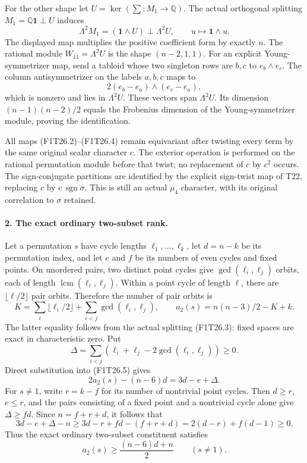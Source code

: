 For the other shape let $U=\ker(\sum:M_1\to\mathbb Q)$.
The actual orthogonal splitting
$M_1=\mathbb Q\boldsymbol1\perp U$ induces
\[
 \Lambda^2M_1=(\boldsymbol1\wedge U)
                  \mathbin{\perp}\Lambda^2U,
 \qquad u\longmapsto\boldsymbol1\wedge u.
 \tag{F1T26.4}
\]
The displayed map multiplies the positive coefficient
form by exactly $n$. The rational module
$W_{11}=\Lambda^2U$ is the shape $(n-2,1,1)$.
For an explicit Young-symmetrizer map, send a tabloid
whose two singleton rows are $b,c$ to $e_b\wedge e_c$.
The column antisymmetrizer on the labels $a,b,c$ maps
to
\[
                 2(e_b-e_a)\wedge(e_c-e_a),
\]
which is nonzero and lies in $\Lambda^2U$. These
vectors span $\Lambda^2U$. Its dimension
$(n-1)(n-2)/2$ equals the Frobenius dimension of the
Young-symmetrizer module, proving the identification.

All maps (F1T26.2)--(F1T26.4) remain equivariant after
twisting every term by the same original scalar
character $c$. The exterior operation is performed
on the rational permutation module before that twist;
no replacement of $c$ by $c^2$ occurs. The sign-conjugate
partitions are identified by the explicit sign-twist
map of T22, replacing $c$ by $c\,\operatorname{sgn}\sigma$.
This is still an actual $\mu_4$ character, with its
original correlation to $\sigma$ retained.

\paragraph{2. The exact ordinary two-subset rank.}
Let a permutation $s$ have cycle lengths
$\ell_1,\ldots,\ell_k$, let $d=n-k$ be its permutation
index, and let $e$ and $f$ be its numbers of even cycles
and fixed points. On unordered pairs, two distinct point
cycles give $\gcd(\ell_i,\ell_j)$ orbits, each of length
$\operatorname{lcm}(\ell_i,\ell_j)$. Within a point cycle
of length $\ell$, there are $\lfloor\ell/2\rfloor$
pair orbits. Therefore the number of pair orbits is
\[
 K=\sum_i\lfloor\ell_i/2\rfloor
                    +\sum_{i<j}\gcd(\ell_i,\ell_j),
 \qquad
 a_2(s)=n(n-3)/2-K+k.
 \tag{F1T26.5}
\]
The latter equality follows from the actual splitting
(F1T26.3): fixed spaces are exact in characteristic zero.
Put
\[
 \Delta=\sum_{i<j}
          (\ell_i+\ell_j-2\gcd(\ell_i,\ell_j))\ge0.
\]
Direct substitution into (F1T26.5) gives
\[
                    2a_2(s)-(n-6)d=3d-e+\Delta.
 \tag{F1T26.6}
\]
For $s\ne1$, write $r=k-f$ for its number of nontrivial
point cycles. Then $d\ge r$, $e\le r$, and the pairs
consisting of a fixed point and a nontrivial cycle alone
give $\Delta\ge fd$. Since $n=f+r+d$, it follows that
\[
 3d-e+\Delta-n
       \ge 3d-r+fd-(f+r+d)
       =2(d-r)+f(d-1)\ge0.
 \tag{F1T26.7}
\]
Thus the exact ordinary two-subset constituent satisfies
\[
                   a_2(s)\ge\frac{(n-6)d+n}{2}
                         \qquad(s\ne1).
 \tag{F1T26.8}
\]


